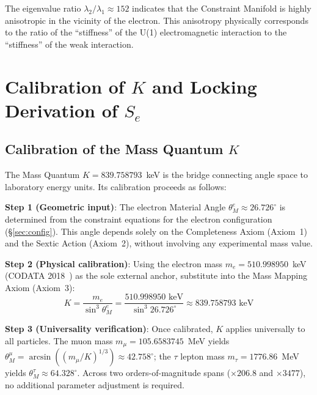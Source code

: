 \documentclass[aps,prd,reprint,nofootinbib]{revtex4-2}
\begin{document}
The eigenvalue ratio $\lambda_2/\lambda_1 \approx 152$ indicates that the Constraint Manifold is highly anisotropic in the vicinity of the electron. This anisotropy physically corresponds to the ratio of the ``stiffness'' of the U(1) electromagnetic interaction to the ``stiffness'' of the weak interaction.

\section{Calibration of $K$ and Locking Derivation of $S_e$}
\label{app:calibration}

\subsection{Calibration of the Mass Quantum $K$}

The Mass Quantum $K = 839.758793$~keV is the bridge connecting angle space to laboratory energy units. Its calibration proceeds as follows:

\textbf{Step 1 (Geometric input)}: The electron Material Angle $\theta_M^e \approx 26.726^\circ$ is determined from the constraint equations for the electron configuration (\S\ref{sec:config}). This angle depends solely on the Completeness Axiom (Axiom~1) and the Sextic Action (Axiom~2), without involving any experimental mass value.

\textbf{Step 2 (Physical calibration)}: Using the electron mass $m_e = 510.998950$~keV (CODATA 2018~\cite{CODATA2018}) as the sole external anchor, substitute into the Mass Mapping Axiom (Axiom~3):
\begin{equation}
K = \frac{m_e}{\sin^3\theta_M^e} = \frac{510.998950 \text{ keV}}{\sin^3 26.726^\circ} \approx 839.758793 \text{ keV}
\end{equation}

\textbf{Step 3 (Universality verification)}: Once calibrated, $K$ applies universally to all particles. The muon mass $m_\mu = 105.6583745$~MeV yields $\theta_M^\mu = \arcsin((m_\mu/K)^{1/3}) \approx 42.758^\circ$; the $\tau$ lepton mass $m_\tau = 1776.86$~MeV yields $\theta_M^\tau \approx 64.328^\circ$. Across two orders-of-magnitude spans ($\times 206.8$ and $\times 3477$), no additional parameter adjustment is required.
\end{document}
